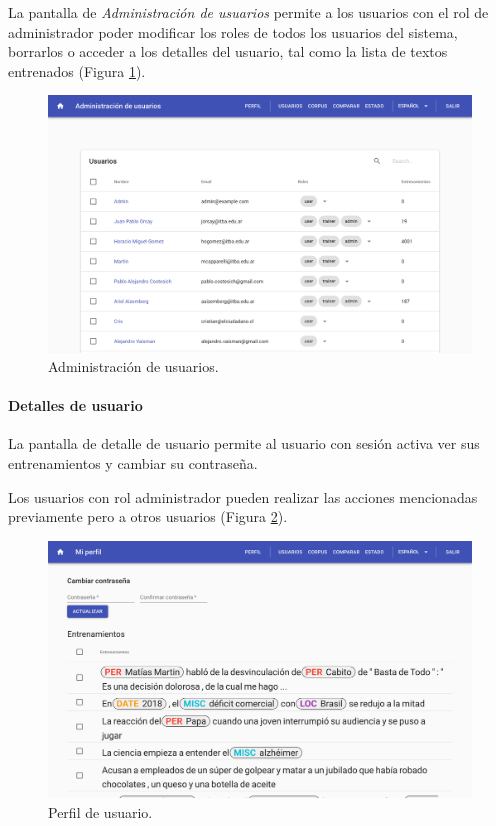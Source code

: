 \documentclass[12pt,a4paper,]{scrartcl}
\let\oldparagraph\paragraph
\renewcommand{\paragraph}[1]{\oldparagraph{#1}\mbox{}}
\begin{document}
La pantalla de \emph{Administración de usuarios} permite a los usuarios con el rol de administrador poder modificar los roles de todos los usuarios del sistema, borrarlos o acceder a los detalles del usuario, tal como la lista de textos entrenados (Figura \ref{fig:logic-user-list}).

\begin{figure}[H]

{\centering \includegraphics{assets/logic/user-list.pdf} 

}

\caption{Administración de usuarios.}\label{fig:logic-user-list}
\end{figure}

\hypertarget{detalles-de-usuario}{%
\paragraph{Detalles de usuario}\label{detalles-de-usuario}}

La pantalla de detalle de usuario permite al usuario con sesión activa ver sus entrenamientos y cambiar su contraseña.

Los usuarios con rol administrador pueden realizar las acciones mencionadas previamente pero a otros usuarios (Figura \ref{fig:logic-user-profile}).

\begin{figure}[H]

{\centering \includegraphics{assets/logic/user-profile.pdf} 

}

\caption{Perfil de usuario.}\label{fig:logic-user-profile}
\end{figure}
\end{document}
